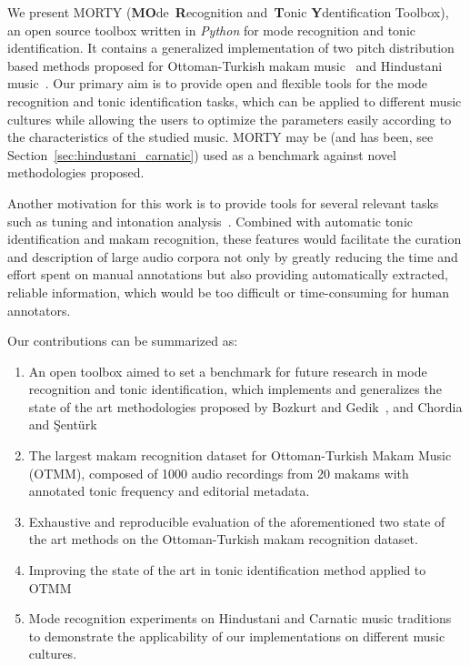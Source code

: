 \documentclass{sig-alternate}
\begin{document}
We present MORTY (\textbf{MO}de~\textbf{R}ecognition and~\textbf{T}onic \textbf{Y}den\-tification Toolbox), an open source toolbox written in \emph{Python} for mode recognition and tonic identification. It contains a generalized implementation of two pitch distribution based methods proposed for Ottoman-Turkish makam music~\cite{bozkurt_tonic, bozkurt_makam} and Hindustani music~\cite{chordia}. Our primary aim is to provide open and flexible tools for the mode recognition and tonic identification tasks, which can be applied to different music cultures while allowing the users to optimize the parameters easily according to the characteristics of the studied music. MORTY may be (and has been, see Section~\ref{sec:hindustani_carnatic}) used as a benchmark against novel methodologies proposed. 

Another motivation for this work is to provide tools for several relevant tasks such as tuning and intonation analysis~\cite{bozkurt_makam}. Combined with automatic tonic identification and makam recognition, these features would facilitate the curation and description of large audio corpora not only by greatly reducing the time and effort spent on manual annotations but also providing automatically extracted, reliable information, which would be too difficult or time-consuming for human annotators.

Our contributions can be summarized as:
\begin{enumerate}[noitemsep]
\item An open toolbox aimed to set a benchmark for future research in mode recognition and tonic identification, which implements and generalizes the state of the art methodologies proposed by Bozkurt and Gedik~\cite{bozkurt_tonic, bozkurt_makam}, and Chordia and \c{S}ent\"{u}rk~\cite{chordia}
\item The largest makam recognition dataset for Ottoman-Turkish Makam Music (OTMM), composed of 1000 audio recordings from 20 makams with annotated tonic frequency and editorial metadata.
\item Exhaustive and reproducible evaluation of the aforementioned two state of the art methods on the Otto\-man-Turkish makam recognition dataset.
\item Improving the state of the art in tonic identification met\-hod applied to OTMM
\item Mode recognition experiments on Hindustani and Carnatic music traditions to demonstrate the applicability of our implementations on different music cultures.
\end{enumerate}
\end{document}
